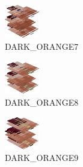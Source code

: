 \hspace{0.1cm}
\begin{minipage}[b]{0.15\linewidth}
\begin{figure}[H]                                                          
  \centering                                                             
  \begin{adjustbox}{width=1.5cm,center}                                   
  \includegraphics[width=1.5cm]{src/colorspace_colourflow/flows/colourflow_55-45.png}%
  \end{adjustbox}                                                        
\caption*{DARK\_ORANGE7}                                           
\end{figure}                                                               
\end{minipage}
\hspace{0.1cm}
\begin{minipage}[b]{0.15\linewidth}
\begin{figure}[H]                                                          
  \centering                                                             
  \begin{adjustbox}{width=1.5cm,center}                                   
  \includegraphics[width=1.5cm]{src/colorspace_colourflow/flows/colourflow_56-45.png}%
  \end{adjustbox}                                                        
\caption*{DARK\_ORANGE8}                                           
\end{figure}                                                               
\end{minipage}
\hspace{0.1cm}
\begin{minipage}[b]{0.15\linewidth}
\begin{figure}[H]                                                          
  \centering                                                             
  \begin{adjustbox}{width=1.5cm,center}                                   
  \includegraphics[width=1.5cm]{src/colorspace_colourflow/flows/colourflow_57-45.png}%
  \end{adjustbox}                                                        
\caption*{DARK\_ORANGE9}                                           
\end{figure}                                                               
\end{minipage}
